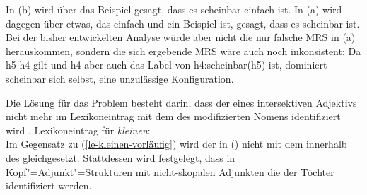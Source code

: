 \noindent
In (b) wird über das Beispiel gesagt, dass es scheinbar einfach ist. In (a) wird
dagegen über etwas, das einfach und ein Beispiel ist, gesagt, dass es scheinbar ist. Bei der bisher
entwickelten Analyse würde aber nicht die nur falsche MRS in (a) herauskommen, sondern die
sich ergebende MRS wäre auch noch inkonsistent:
\ea
{}
\z
Da h5 \qeq h4 gilt und h4 aber auch das Label von h4:scheinbar(h5) ist, dominiert scheinbar sich
selbst, eine unzulässige Konfiguration.

Die Lösung für das Problem besteht darin, dass der \ltopw eines intersektiven Adjektivs nicht mehr
im Lexikoneintrag mit dem des modifizierten Nomens identifiziert wird \citep[Section~6.3]{CFPS2005a}. 
\eas
Lexikoneintrag für \emph{kleinen}:\\%
\zs
Im Gegensatz zu (\ref{le-kleinen-vorläufig}) wird der \ltopw in () nicht mit dem \ltopw innerhalb des \modwes gleichgesetzt.
Stattdessen wird festgelegt, dass in Kopf"=Adjunkt"=Strukturen mit nicht-skopalen Adjunkten die \ltopwe der Töchter identifiziert
werden. 
\ea
\label{ex-scopal-ltop}
 \impl\\
\hfill 
{}
\z

